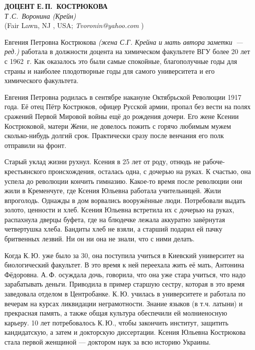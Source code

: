 \begin{center}{ \bf ДОЦЕНТ Е.\,П.~КОСТРЮКОВА}\\
{\it Т\,.С.~Воронина (Крейн)} \\
(Fair Lawn, NJ , USA; {\it Tvoronin@yahoo.com} )
\end{center}
Евгения Петровна Кострюкова
\textit{(жена С.Г. Крейна и мать автора заметки~--- ред.)}
работала в должности доцента на химическом факультете ВГУ более 20 лет с 1962~г.
Как оказалось это были самые спокойные, благополучные годы для страны и наиболее плодотворные годы для самого университета и его химического факультета.

Евгения Петровна родилась в сентябре накануне Ок\-тяб\-рь\-с\-кой Революции 1917 года.
Её отец Пётр Кострюков, офицер Русской армии, пропал без вести на полях сражений Первой Мировой войны ещё до рождения дочери. Его жене Ксении Кострюковой, матери Жени, не довелось пожить с горячо любимым мужем сколько-нибудь долгий срок. Практически сразу после венчания его полк отправили на фронт.

Старый уклад жизни рухнул. Ксения в 25 лет от роду, отнюдь не рабоче-крестьянского происхождения, осталась одна,
с дочерью на руках. К счастью, она успела до революции кончить гимназию.
Какое-то время после революции они жили в Кременчуге, где Ксения Юльевна работала учительницей. Жили впроголодь. Однажды в дом ворвались вооружённые люди. Потребовали выдать золото, ценности и хлеб. Ксения Юльевна встретила их с дочерью на руках, распахнула дверцы буфета, где на блюдечке лежала аккуратно завёрнутая четвертушка хлеба. Бандиты хлеб не взяли, а старший подарил ей пачку бритвенных лезвий. Ни он ни она не знали, что с ними делать.

Когда К.\,Ю. уже было за 30, она поступила учиться в Киевский университет на биологический факультет. В это время к ней переехала жить её мать, Антонина Фёдоровна. А.\,Ф. осуждала дочь, говорила, что она уже стара учиться, что надо зарабатывать деньги. Приводила в пример старшую сестру, которая в это время заведовала отделом в Центробанке. К.\,Ю. училась в университете и работала по вечерам на курсах ликвидации неграмотности. Знание языков (в т.ч. латыни) и прекрасная память, а также общая культура обеспечили ей молниеносную карьеру. 10 лет потребовалось К.\,Ю., чтобы закончить институт, защитить кандидатскую, а затем и докторскую диссертации. Ксения Юльевна Кострюкова стала первой женщиной --- доктором наук за всю историю Украины.

